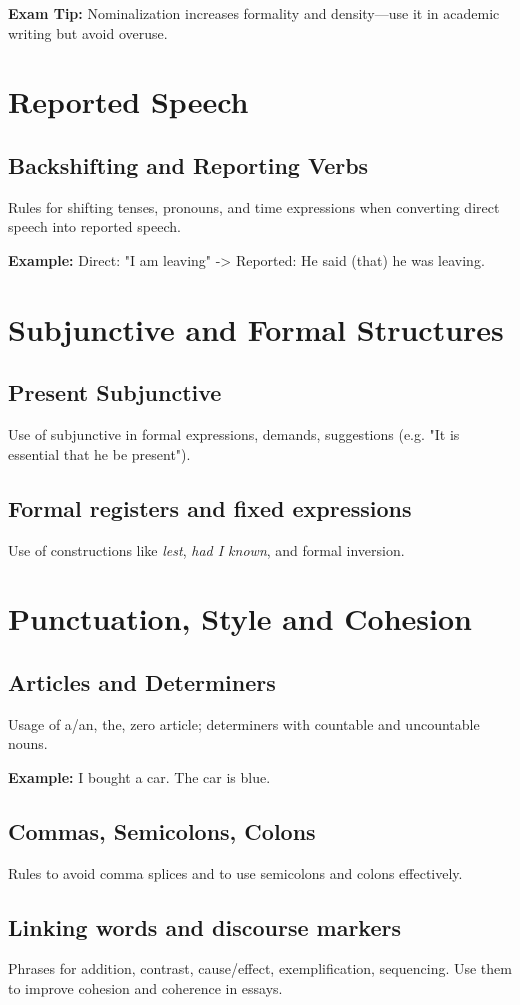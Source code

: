 \documentclass[12pt,oneside]{book}
\newcommand{\ex}[1]{\begin{examplebox}\textbf{Example:} #1\end{examplebox}}
\newcommand{\tip}[1]{\begin{examptip}\textbf{Exam Tip:} #1\end{examptip}}
\begin{document}
\tip{Nominalization increases formality and density—use it in academic writing but avoid overuse.}

\chapter{Reported Speech}
\section{Backshifting and Reporting Verbs}
Rules for shifting tenses, pronouns, and time expressions when converting direct speech into reported speech.

\ex{Direct: "I am leaving" -> Reported: He said (that) he was leaving.}

\chapter{Subjunctive and Formal Structures}
\section{Present Subjunctive}
Use of subjunctive in formal expressions, demands, suggestions (e.g. "It is essential that he be present").

\section{Formal registers and fixed expressions}
Use of constructions like \textit{lest}, \textit{had I known}, and formal inversion.

\chapter{Punctuation, Style and Cohesion}
\section{Articles and Determiners}
Usage of a/an, the, zero article; determiners with countable and uncountable nouns.

\ex{I bought a car. The car is blue.}

\section{Commas, Semicolons, Colons}
Rules to avoid comma splices and to use semicolons and colons effectively.

\section{Linking words and discourse markers}
Phrases for addition, contrast, cause/effect, exemplification, sequencing. Use them to improve cohesion and coherence in essays.
\end{document}
